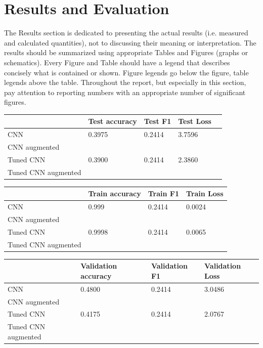 \section{Results and Evaluation}
The Results section is dedicated to presenting the actual results (i.e. measured and calculated quantities), not to discussing their meaning or interpretation.
The results should be summarized using appropriate Tables and Figures (graphs or schematics).
Every Figure and Table should have a legend that describes concisely what is contained or shown.
Figure legends go below the figure, table legends above the table.
Throughout the report, but especially in this section, pay attention to reporting numbers with an appropriate number of significant figures.



\begin{table}[ht]
\begin{tabular}{|l|l|l|l|l|}
\hline
                    & Test accuracy & Test F1 & Test Loss \\ \hline
CNN                 & 0.3975        & 0.2414  & 3.7596    \\ \hline
CNN augmented       &                     &               & \\ \hline
Tuned CNN           & 0.3900        & 0.2414  & 2.3860\\ \hline
Tuned CNN augmented &                     &               & \\ \hline
\end{tabular}
\end{table}

\begin{table}[ht]
\begin{tabular}{|l|l|l|l|}
\hline
                    & Train accuracy & Train F1 & Train Loss \\ \hline
CNN                 & 0.999          & 0.2414   & 0.0024    \\ \hline
CNN augmented       &                     &               & \\ \hline
Tuned CNN           & 0.9998         & 0.2414   & 0.0065    \\ \hline
Tuned CNN augmented &                     &               & \\ \hline
\end{tabular}
\end{table}

\begin{table}[ht]
\begin{tabular}{|l|l|l|l|}
\hline
                    & Validation accuracy & Validation F1 & Validation Loss \\ \hline
CNN                & 0.4800              & 0.2414        & 3.0486          \\ \hline
CNN augmented       &                     &               &                 \\ \hline
Tuned CNN           & 0.4175              & 0.2414        & 2.0767          \\ \hline
Tuned CNN augmented &                     &               &                 \\ \hline
\end{tabular}
\end{table}

